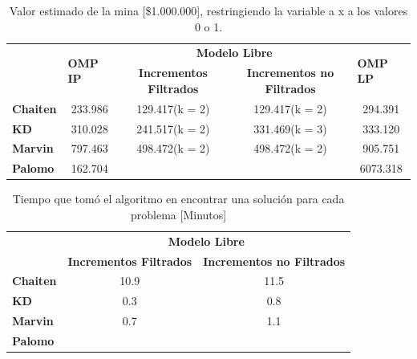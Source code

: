 \documentclass[12pt,letterpaper]{article}
\begin{document}
\begin{table}[H]
\centering
\begin{tabular}{|l|cccc|}
\hline
\multirow{2}{*}{} & \multicolumn{1}{l|}{\multirow{2}{*}{\textbf{OMP IP}}} & \multicolumn{2}{c|}{\textbf{Modelo Libre}}                                     & \multicolumn{1}{l|}{\multirow{2}{*}{\textbf{OMP LP}}} \\ \cline{3-4}
                  & \multicolumn{1}{l|}{}                        & \textbf{Incrementos Filtrados} & \multicolumn{1}{c|}{\textbf{Incrementos no Filtrados}} & \multicolumn{1}{l|}{}                        \\ \hline
\textbf{Chaiten}  & 233.986                                      & 129.417(k = 2)        & 129.417(k = 2)                                & 294.391                                      \\ \hline
\textbf{KD}       & 310.028                                      & 241.517(k = 2)        & 331.469(k = 3)                                & 333.120                                      \\ \hline
\textbf{Marvin}   & 797.463                                      & 498.472(k = 2)        & 498.472(k = 2)                                & 905.751                                      \\ \hline
\textbf{Palomo}   & 162.704                                      &                       &                                               & 6073.318                                     \\ \hline
\end{tabular}
\caption{Valor estimado de la mina [\$1.000.000], restringiendo la variable a x a los valores 0 o 1.}
\end{table}

\begin{table}[H]
\centering
\begin{tabular}{|l|cc|}
\hline
\multicolumn{1}{|l|}{\multirow{2}{*}{}} & \multicolumn{2}{c|}{\textbf{Modelo Libre}}                         \\ \cline{2-3} 
\multicolumn{1}{|l|}{}                  & \textbf{Incrementos Filtrados} & \textbf{Incrementos no Filtrados} \\ \hline
\textbf{Chaiten}                        & 10.9                           & 11.5                              \\ \hline
\textbf{KD}                             & 0.3                            & 0.8                               \\ \hline
\textbf{Marvin}                         & 0.7                            & 1.1                               \\ \hline
\textbf{Palomo}                         &                                &                                   \\ \hline
\end{tabular}
\caption{Tiempo que tomó el algoritmo en encontrar una solución para cada problema [Minutos]}
\end{table}
\end{document}
